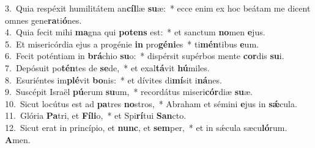 {3.~}Quia respéxit humilitátem an\textbf{cíl}læ \textbf{su}æ:~* ecce enim ex hoc beátam me dicent omnes gene\textbf{ra}ti\textbf{ó}nes.\\
{4.~}Quia fecit mihi \textbf{ma}gna qui \textbf{po}\textbf{tens} est:~* et sanctum \textbf{no}men \textbf{e}jus.\\
{5.~}Et misericórdia ejus a progénie \textbf{in} pro\textbf{gé}\textbf{ni}es~* ti\textbf{mén}tibus \textbf{e}um.\\
{6.~}Fecit poténtiam in \textbf{brá}chio \textbf{su}o:~* dispérsit supérbos mente \textbf{cor}dis \textbf{su}i.\\
{7.~}Depósuit po\textbf{tén}tes de \textbf{se}de,~* et exal\textbf{tá}vit \textbf{hú}miles.\\
{8.~}Esuriéntes im\textbf{plé}vit \textbf{bo}nis:~* et dívites di\textbf{mí}sit i\textbf{ná}nes.\\
{9.~}Suscépit Israël \textbf{pú}erum \textbf{su}um,~* recordátus miseri\textbf{cór}diæ \textbf{su}æ.\\
{10.~}Sicut locútus est ad \textbf{pa}tres \textbf{no}stros,~* Abraham et sémini \textbf{e}jus in \textbf{sǽ}cula.\\
{11.~}Glória \textbf{Pa}tri, et \textbf{Fí}\textbf{li}o,~* et Spi\textbf{rí}tui \textbf{San}cto.\\
{12.~}Sicut erat in princípio, et \textbf{nunc}, et \textbf{sem}per,~* et in sǽcula sæcu\textbf{ló}rum. \textbf{A}men.\\
